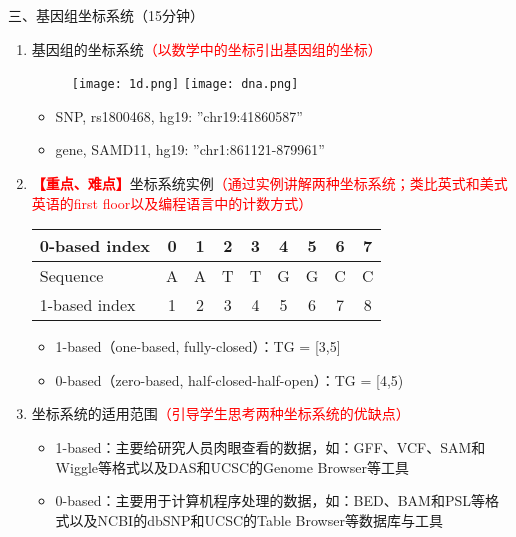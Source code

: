 \documentclass{TIJMUjiaoanLL}
\begin{document}
\vspace*{0.2cm}
\noindent
三、基因组坐标系统（15分钟）
\begin{enumerate}
  \item 基因组的坐标系统\textcolor{red}{（以数学中的坐标引出基因组的坐标）}
    \begin{figure}[h]
    \centering
      \texttt{[image: 1d.png]}
      \hspace*{0.2cm}
      \texttt{[image: dna.png]}
    \end{figure}
    \begin{itemize}
      \item SNP, rs1800468, hg19: ''chr19:41860587''
      \item gene, SAMD11, hg19: ''chr1:861121-879961''
    \end{itemize}
  \item \textcolor{red}{\textbf{【重点、难点】}}坐标系统实例\textcolor{red}{（通过实例讲解两种坐标系统；类比英式和美式英语的first floor以及编程语言中的计数方式）}
    \begin{table}[h]
    \hspace*{2cm}
    \begin{tabular}{lcccccccc}
      \hline
      0-based index & 0 & 1 & 2 & 3 & 4 & 5 & 6 & 7\\
      \hline
      Sequence & A & A & T & T & G & G & C & C\\
      \hline
      1-based index & 1 & 2 & 3 & 4 & 5 & 6 & 7 & 8\\
      \hline
    \end{tabular}
  \end{table}
  \begin{itemize}
    \item 1-based（one-based, fully-closed）：TG = [3,5]
    \item 0-based（zero-based, half-closed-half-open）：TG = [4,5)
  \end{itemize}
  \item 坐标系统的适用范围\textcolor{red}{（引导学生思考两种坐标系统的优缺点）}
    \begin{itemize}
      \item 1-based：主要给研究人员肉眼查看的数据，如：GFF、VCF、SAM和Wiggle等格式以及DAS和UCSC的Genome Browser等工具
      \item 0-based：主要用于计算机程序处理的数据，如：BED、BAM和PSL等格式以及NCBI的dbSNP和UCSC的Table Browser等数据库与工具
    \end{itemize}
\end{enumerate}
\end{document}
